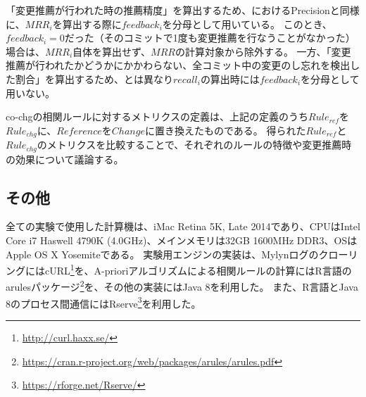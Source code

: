 \documentclass[a4paper]{jsbook}
\begin{document}
「変更推薦が行われた時の推薦精度」を算出するため、\cite{Zimmermann:2005}におけるPrecisionと同様に、$MRR_i$を算出する際に$feedback_i$を分母として用いている。
このとき、$feedback_i=0$だった（そのコミットで1度も変更推薦を行なうことがなかった）場合は、$MRR_i$自体を算出せず、$MRR$の計算対象から除外する。
一方、「変更推薦が行われたかどうかにかかわらない、全コミット中の変更のし忘れを検出した割合」を算出するため、\cite{Zimmermann:2005}とは異なり$recall_i$の算出時には$feedback_i$を分母として用いない。

co-chgの相関ルールに対するメトリクスの定義は、上記の定義のうち$Rule_{ref}$を$Rule_{chg}$に、$Reference$を$Change$に置き換えたものである。
得られた$Rule_{ref}$と$Rule_{chg}$のメトリクスを比較することで、それぞれのルールの特徴や変更推薦時の効果について議論する。

\subsection{その他}
全ての実験で使用した計算機は、iMac Retina 5K, Late 2014であり、CPUはIntel Core i7 Haswell 4790K (4.0GHz)、メインメモリは32GB 1600MHz DDR3、OSはApple OS X Yosemiteである。
実験用エンジンの実装は、MylynログのクローリングにはcURL\footnote{\url{http://curl.haxx.se/}}を、A-prioriアルゴリズムによる相関ルールの計算にはR言語のarulesパッケージ\footnote{\url{https://cran.r-project.org/web/packages/arules/arules.pdf}}を、その他の実装にはJava 8を利用した。
また、R言語とJava 8のプロセス間通信にはRserve\footnote{\url{https://rforge.net/Rserve/}}を利用した。
\end{document}
